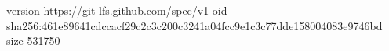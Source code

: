 version https://git-lfs.github.com/spec/v1
oid sha256:461e89641cdccacf29c2c3c200c3241a04fcc9e1c3c77dde158004083e9746bd
size 531750
